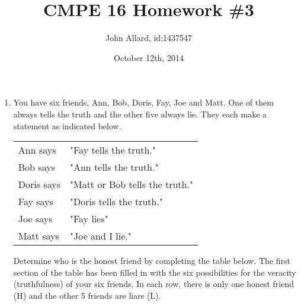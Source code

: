 \documentclass[a4paper,11pt]{article}
\title{ CMPE 16 Homework \#3}
\author{John Allard, id:1437547}
\date{October 12th, 2014}
\begin{document}
\maketitle


\begin{enumerate}


\item You have six friends, Ann, Bob, Doris, Fay, Joe and Matt. One of them always tells the
truth and the other five always lie. They each make a statement as indicated below. \\[.2in]
\begin{tabular}{l l}
Ann says  & "Fay tells the truth." \\ 
Bob says  & "Ann tells the truth." \\
Doris says  & "Matt or Bob tells the truth." \\
Fay says  & "Doris tells the truth." \\
Joe says  & "Fay lies" \\
Matt says  & "Joe and I lie." \\[.2in]
\end{tabular}

Determine who is the honest friend by completing the table below. The first section of the table has been filled in with the six possibilities for the veracity (truthfulness) of your six friends, In each row, there is only one honest friend (H) and the other 5 friends are liars (L).


\end{enumerate}
\end{document}

